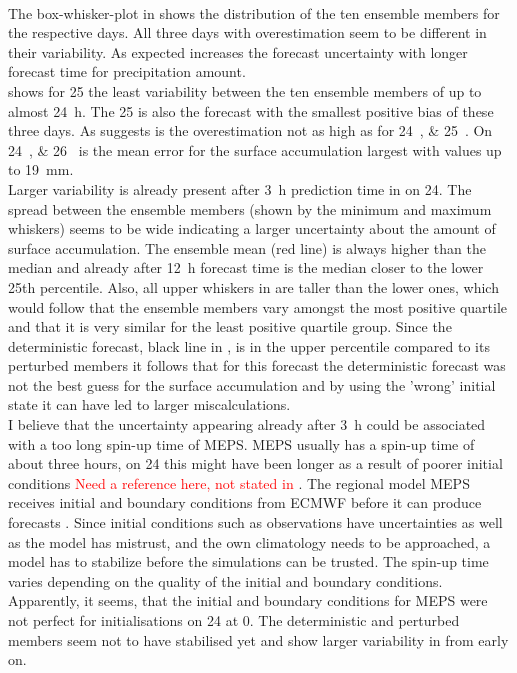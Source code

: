 \\
The box-whisker-plot in  shows the distribution of the ten ensemble members for the respective days. All three days with overestimation seem to be different in their variability. As expected increases the forecast uncertainty with longer forecast time for precipitation amount.  
\\
 shows for \SI{25}{\dec} the least variability between the ten ensemble members of up to almost \SI{24}{\hour}. The \SI{25}{\dec} is also the forecast with the smallest positive bias of these three days. As  suggests is the overestimation not as high as for \SIlist{24;25}{\dec}. On \SIlist{24;26}{\dec} is the mean error for the surface accumulation largest with values up to \SI{19}{\mm}. 
\\
Larger variability is already present after \SI{3}{\hour} prediction time in  on \SI{24}{\dec}. The spread between the ensemble members (shown by the minimum and maximum whiskers) seems to be wide indicating a larger uncertainty about the amount of surface accumulation. The ensemble mean (red line) is always higher than the median and already after \SI{12}{\hour} forecast time is the median closer to the lower 25th percentile. Also, all upper whiskers in  are taller than the lower ones, which would follow that the ensemble members vary amongst the most positive quartile and that it is very similar for the least positive quartile group. Since the deterministic forecast, black line in , is in the upper percentile compared to its perturbed members it follows that for this forecast the deterministic forecast was not the best guess for the surface accumulation and by using the 'wrong' initial state it can have led to larger miscalculations. 
\\
I believe that the uncertainty appearing already after \SI{3}{\hour} could be associated with a too long spin-up time of MEPS. MEPS usually has a spin-up time of about three hours, on \SI{24}{\dec} this might have been longer as a result of poorer initial conditions \textcolor{red}{Need a reference here, not stated in \citet{muller_arome-metcoop:_2017}}. The regional model MEPS receives initial and boundary conditions from ECMWF before it can produce forecasts \citep{muller_arome-metcoop:_2017}. Since initial conditions such as observations have uncertainties as well as the model has mistrust, and  the own climatology needs to be approached, a model has to stabilize before the simulations can be trusted. The spin-up time varies depending on the quality of the initial and boundary conditions. Apparently, it seems, that the initial and boundary conditions for MEPS were not perfect for initialisations on \SI{24}{\dec} at \SI{0}{\UTC}. The deterministic and perturbed members seem not to have stabilised yet and show larger variability in  from early on.
